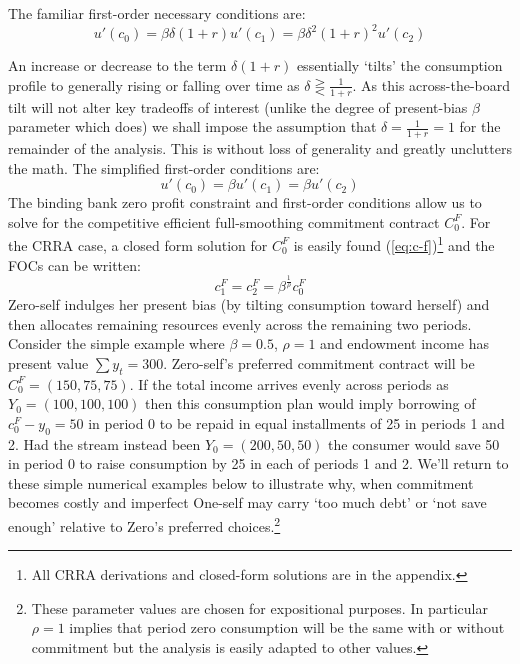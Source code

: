 \documentclass[11pt,english]{article}
\theoremstyle{plain}
\theoremstyle{definition}
\begin{document}
The familiar first-order necessary conditions are: 
\begin{equation}
u'\left(c_{0}\right)=\beta\delta(1+r)u'\left(c_{1}\right)=\beta\delta^{2}(1+r)^{2}u'\left(c_{2}\right)
\end{equation}

An increase or decrease to the term $\delta(1+r)$ essentially `tilts'
the consumption profile to generally rising or falling over time as
$\delta\gtreqless\frac{1}{1+r}$. As this across-the-board tilt will
not alter key tradeoffs of interest (unlike the degree of present-bias
$\beta$ parameter which does) we shall impose the assumption that
$\delta=\frac{1}{1+r}=1$ for the remainder of the analysis. This
is without loss of generality and greatly unclutters the math. The
simplified first-order conditions are: 
\begin{equation}
u'\left(c_{0}\right)=\beta u'\left(c_{1}\right)=\beta u'\left(c_{2}\right)\label{eq:FOC_comp}
\end{equation}
The binding bank zero profit constraint and first-order conditions
allow us to solve for the competitive efficient full-smoothing commitment
contract $C_{0}^{F}$. For the CRRA case, a closed form solution for $C_{0}^{F}$ is
easily found (\ref{eq:c-f})\footnote{All CRRA derivations and closed-form solutions are in the appendix.}
and the FOCs can be written: 
\begin{equation}
c_{1}^{F}=c_{2}^{F}=\beta^{\frac{1}{\rho}}c_{0}^{F}
\end{equation}
Zero-self indulges her present bias (by tilting consumption toward
herself) and then allocates remaining resources  evenly
across the remaining two periods.
Consider the simple example where $\beta=0.5$, $\rho=1$ and endowment
income has present value $\sum y_{t}=300$. Zero-self's preferred
commitment contract will be $C_{0}^{F}=(150,75,75)$. If the total
income arrives evenly across periods as $Y_{0}=(100,100,100)$ then
this consumption plan would imply borrowing of $c_{0}^{F}-y_{0}=50$
in period 0 to be repaid in equal installments of 25 in periods 1
and 2. Had the stream instead been $Y_{0}=(200,50,50)$ the consumer
would save 50 in period 0 to raise consumption by 25 in each of periods
1 and 2. We'll return to these simple numerical examples below to illustrate
why, when commitment becomes costly and imperfect One-self may carry
`too much debt' or `not save enough' relative to Zero's preferred
choices.\footnote{These parameter values are chosen for expositional purposes. In particular
$\rho=1$ implies that period zero consumption will be the same with
or without commitment but the analysis is easily adapted to other
values.}
\end{document}
